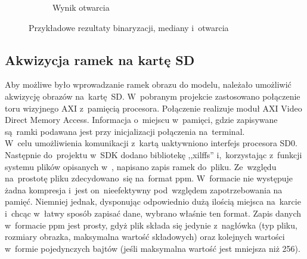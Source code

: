 \begin{figure}
\begin{subfigure}{0.7\textwidth}
		\caption{Wynik otwarcia}
		\label{fig:opened_1}
	\end{subfigure}
	\caption{Przykładowe rezultaty binaryzacji, mediany i~otwarcia}
	\label{fig:operacje}
\end{figure}


\subsection{Akwizycja ramek na kartę SD}
Aby możliwe było wprowadzanie ramek obrazu do modelu, należało umożliwić akwizycję obrazów na~kartę~SD. W~pobranym projekcie zastosowano połączenie toru wizyjnego AXI z~pamięcią procesora. Połączenie realizuje moduł AXI Video Direct Memory Access. Informacja o~miejscu w~pamięci, gdzie zapisywane są~ramki podawana jest przy inicjalizacji połączenia na~terminal. \\
W~celu umożliwienia komunikacji z~kartą uaktywniono interfejs procesora SD0. Następnie do~projektu w~SDK dodano bibliotekę ,,xilffs'' i,~korzystając z~funkcji systemu plików opisanych w~\cite{xilffs}, napisano zapis ramek do~pliku. 
Ze~względu na~prostotę pliku zdecydowano~się na~format ppm. W~formacie nie występuje żadna kompresja i~jest on~nieefektywny pod~względem zapotrzebowania na pamięć. Niemniej jednak, dysponując odpowiednio dużą ilością miejsca na~karcie i~chcąc w~łatwy sposób zapisać dane, wybrano właśnie ten format. Zapis danych w~formacie ppm jest prosty, gdyż plik składa się jedynie z~nagłówka (typ pliku, rozmiary obrazka, maksymalna wartość składowych) oraz kolejnych wartości w~formie pojedynczych bajtów (jeśli maksymalna wartość jest mniejsza niż 256).  \\


